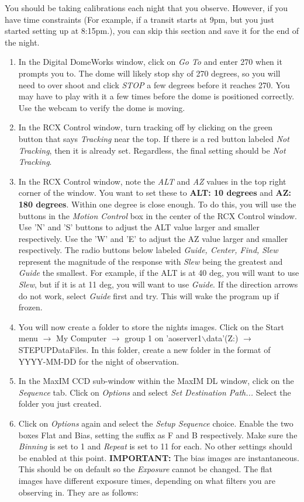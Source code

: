 \documentclass[11pt]{report}
\begin{document}
You should be taking calibrations each night that you observe. However, if you have time constraints (For example, if a transit starts at 9pm, but you just started setting up at 8:15pm.), you can skip this section and save it for the end of the night.
\begin{enumerate}
\item In the Digital DomeWorks window, click on \emph{Go To} and enter 270 when it prompts you to. The dome will likely stop shy of 270 degrees, so you will need to over shoot and click \emph{STOP} a few degrees before it reaches 270. You may have to play with it a few times before the dome is positioned correctly. Use the webcam to verify the dome is moving.
\item In the RCX Control window, turn tracking off by clicking on the green button that says \emph{Tracking} near the top. If there is a red button labeled \emph{Not Tracking}, then it is already set. Regardless, the final setting should be \emph{Not Tracking}.
\item In the RCX Control window, note the \emph{ALT} and \emph{AZ} values in the top right corner of the window. You want to set these to {\bf ALT: 10 degrees} and {\bf AZ: 180 degrees}. Within one degree is close enough. To do this, you will use the buttons in the \emph{Motion Control} box in the center of the RCX Control window. Use 'N' and 'S' buttons to adjust the ALT value larger and smaller respectively. Use the 'W' and 'E' to adjust the AZ value larger and smaller respectively. The radio buttons below labeled \emph{Guide, Center, Find, Slew} represent the magnitude of the response with \emph{Slew} being the greatest and \emph{Guide} the smallest. For example, if the ALT is at 40 deg, you will want to use \emph{Slew}, but if it is at 11 deg, you will want to use \emph{Guide}. If the direction arrows do not work, select \emph{Guide} first and try. This will wake the program up if frozen.
\item You will now create a folder to store the nights images. Click on the Start menu {$\rightarrow$} My Computer {$\rightarrow$} group 1 on 'aoserver1{$\backslash$}data'(Z:) {$\rightarrow$} STEPUPDataFiles. In this folder, create a new folder in the format of YYYY-MM-DD for the night of observation.
\item In the MaxIM CCD sub-window within the MaxIM DL window, click on the \emph{Sequence} tab. Click on \emph{Options} and select \emph{Set Destination Path...} Select the folder you just created.
\item Click on \emph{Options} again and select the \emph{Setup Sequence} choice. Enable the two boxes Flat and Bias, setting the suffix as F and B respectively. Make sure the \emph{Binning} is set to 1 and \emph{Repeat} is set to 11 for each. No other settings should be enabled at this point. {\bf IMPORTANT:} The bias images are instantaneous. This should be on default so the \emph{Exposure} cannot be changed. The flat images have different exposure times, depending on what filters you are observing in. They are as follows:

\end{enumerate}
\end{document}
